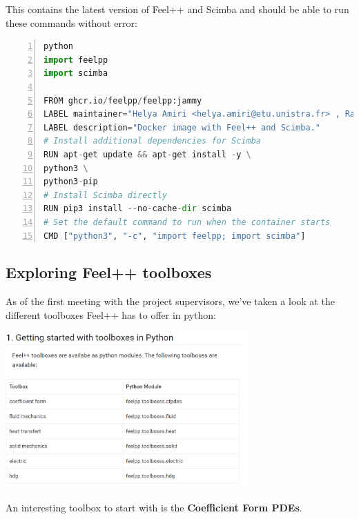 \documentclass{article}
\begin{document}
This contains the latest version of Feel++ and Scimba and should be able to run these commands without error:


\begin{lstlisting}[language=Python,caption={Docker image with Feel++ and Scimba}, label={lst:python-example}, frame=single, basicstyle=\footnotesize, breaklines=true, commentstyle=\color{mygreen}, keywordstyle=\color{blue}, numbers=left, numbersep=4pt,stringstyle=\color{mymauve}]
python
import feelpp
import scimba

FROM ghcr.io/feelpp/feelpp:jammy
LABEL maintainer="Helya Amiri <helya.amiri@etu.unistra.fr> , Rayen Tlili <rayen.tlili@etu.unistra.fr>"
LABEL description="Docker image with Feel++ and Scimba."
# Install additional dependencies for Scimba
RUN apt-get update && apt-get install -y \
python3 \
python3-pip
# Install Scimba directly
RUN pip3 install --no-cache-dir scimba
# Set the default command to run when the container starts
CMD ["python3", "-c", "import feelpp; import scimba"]
\end{lstlisting}



\subsection{Exploring Feel++ toolboxes}

As of the first meeting with the project supervisors, we've taken a look at the different toolboxes Feel++ has to offer in python:


\begin{frame}{}
    \begin{center}
        \includegraphics[width=0.7\textwidth]{images/pyfeelpptoolboxes.png}
    \end{center}
\end{frame}

An interesting toolbox to start with is the \textbf{Coefficient Form PDEs}.
\end{document}
